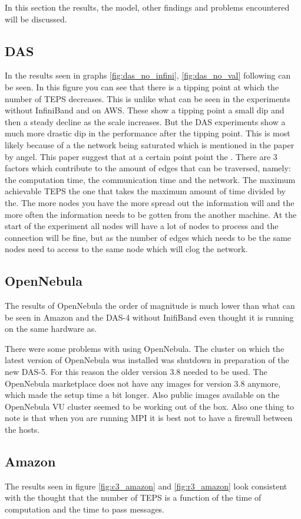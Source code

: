 In this section the results, the model, other findings and problems encountered will be discussed.

\subsection{DAS}
In the results seen in graphs \ref{fig:das_no_infini}, \ref{fig:das_no_val} following can be seen. In this figure you can see that there is a tipping point at which the number of TEPS decreases. This is unlike what can be seen in the experiments without InfiniBand and on AWS. These show a tipping point a small dip and then a steady decline as the scale increases. But the DAS experiments show a much more drastic dip in the performance after the tipping point. This is most likely because of a the network being saturated which is mentioned in the paper by angel. This paper suggest that at a certain point point the . There are 3 factors which contribute to the amount of edges that can be traversed, namely: the computation time, the communication time and the network. The maximum achievable TEPS the one that takes the maximum amount of time divided by the. The more nodes you have the more spread out the information will and the more often the information needs to be gotten from the another machine. At the start of the experiment all nodes will have a lot of nodes to process and the connection will be fine, but as the number of edges which needs to be the same nodes need to access to the same node which will clog the network.


\subsection{OpenNebula}
The results of OpenNebula the order of magnitude is much lower than what can be seen in Amazon and the DAS-4 without InifiBand even thought it is running on the same hardware as.

There were some problems with using OpenNebula. The cluster on which the latest version of OpenNebula was installed was shutdown in preparation of the new DAS-5. For this reason the older version 3.8 needed to be used. The OpenNebula marketplace does not have any images for version 3.8 anymore, which made the setup time a bit longer. Also public images available on the OpenNebula VU cluster seemed to be working out of the box. Also one thing to note is that when you are running MPI it is best not to have a firewall between the hosts. 

\subsection{Amazon}
The results seen in figure \ref{fig:c3_amazon} and \ref{fig:r3_amazon} look consistent with the thought that the number of TEPS is a function of the time of computation and the time to pass messages. 

